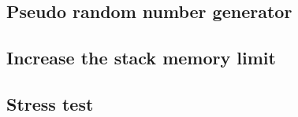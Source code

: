 \subsection{Pseudo random number generator}
\raggedbottom
\hrulefill
\subsection{Increase the stack memory limit}
\raggedbottom
\hrulefill
\subsection{Stress test}
\raggedbottom
\hrulefill
